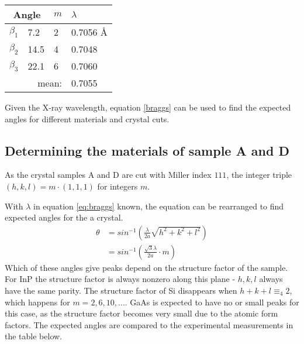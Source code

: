 \documentclass[a4paper,twoside=false,abstract=false,numbers=noenddot,
titlepage=false,headings=small,parskip=half,version=last]{scrartcl}
\begin{document}
\begin{tabular}{ |l|l|l|l| }
    \hline
    \multicolumn{2}{|c|}{Angle}& $m$ & $\lambda$\\
    \hline
    $\beta_1$	& 7.2\degree	& 2	& 0.7056 Å	\\
    $\beta_2$	& 14.5\degree	& 4	& 0.7048	\\
    $\beta_3$	& 22.1\degree	& 6	& 0.7060	\\
	\hline
	\multicolumn{3}{r|}{mean:}	& 0.7055	\\
    \cline{4-4}
\end{tabular}

Given the X-ray wavelength, equation \eqref{braggs} can be used to find the expected angles for different materials and crystal cuts.

\subsection{Determining the materials of sample A and D}

As the crystal samples A and D are cut with Miller index $111$,
the integer triple $(h,k,l)=m\cdot (1,1,1)$ for integers $m$.

With $\lambda$ in equation \eqref{eq:braggs} known, the equation can be rearranged to find expected angles for the a crystal.
\begin{align}
\label{eq:braggangle}
\theta&=sin^{-1}\left( \frac{\lambda}{2a} \sqrt{h^2+k^2+l^2}\right)\\
&=sin^{-1}\left( \frac{\sqrt{3}\lambda}{2a} \cdot m\right)\nonumber
\end{align}
Which of these angles give peaks depend on the structure factor of the sample.
For InP the structure factor is always nonzero along this plane - $h,k,l$ always have the same parity.
The structure factor of Si disappears when $h+k+l\equiv_4 2$, which happens for $m=2,6,10,...$.
GaAs is expected to have no or small peaks for this case, as the structure factor becomes very small due to the atomic form factors.
The expected angles are compared to the experimental measurements in the table below.
\end{document}
